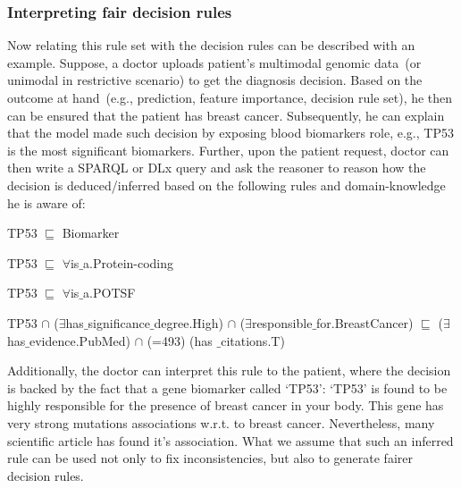 \subsubsection{Interpreting fair decision rules}

Now relating this rule set with the decision rules can be described with an example. Suppose, a doctor uploads patient's multimodal genomic data~(or unimodal in restrictive scenario) to get the diagnosis decision. Based on the outcome at hand~(e.g., prediction, feature importance, decision rule set), he then can be ensured that the patient has breast cancer. Subsequently, he can explain that the model made such decision by exposing blood biomarkers role, e.g., TP53 is the most significant biomarkers. Further, upon the patient request, doctor can then write a SPARQL or DLx query and ask the reasoner to reason how the decision is deduced/inferred based on the following rules and domain-knowledge he is aware of:  

\begin{itemize}[noitemsep]
\scriptsize{
    \item TP53 $ \sqsubseteq  $ Biomarker
    \item TP53 $ \sqsubseteq  $ $  \forall $is$ {\_}$a.Protein-coding
    \item TP53 $ \sqsubseteq  $ $  \forall $is$ {\_}$a.POTSF
    \item TP53 $  \cap $ ($\exists$has$ {\_}$significance$ {\_}$degree.High) $  \cap $ ($\exists$responsible$ {\_}$for.BreastCancer) $ \sqsubseteq  $ ($\exists$has$ {\_}$evidence.PubMed) $\cap$ (=493) (has ${\_}$citations.T)}
\end{itemize}

\hspace*{3.5mm} Additionally, the doctor can interpret this rule to the patient, where the decision is backed by the fact that a gene biomarker called `TP53': `TP53' is found to be highly responsible for the presence of breast cancer in your body. This gene has very strong mutations associations w.r.t. to breast cancer. Nevertheless, many scientific article has found it's association. What we assume that such an inferred rule can be used not only to fix inconsistencies, but also to generate fairer decision rules.


